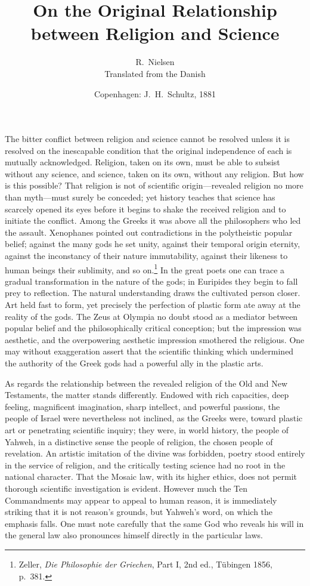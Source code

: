 \documentclass[12pt,a4paper]{article}
\title{\textbf{On the Original Relationship\\[4pt]
       between Religion and Science}}
\author{R.\ Nielsen\\[4pt]
  \small Translated from the Danish}
\date{Copenhagen: J.\ H.\ Schultz, 1881}
\begin{document}
\maketitle
\thispagestyle{fancy}

\bigskip

The bitter conflict between religion and science cannot be resolved
unless it is resolved on the inescapable condition that the original
independence of each is mutually acknowledged. Religion, taken on its
own, must be able to subsist without any science, and science, taken on
its own, without any religion. But how is this possible? That religion
is not of scientific origin---revealed religion no more than myth---must
surely be conceded; yet history teaches that science has scarcely
opened its eyes before it begins to shake the received religion and to
initiate the conflict. Among the Greeks it was above all the
philosophers who led the assault. Xenophanes pointed out contradictions
in the polytheistic popular belief; against the many gods he set unity,
against their temporal origin eternity, against the inconstancy of
their nature immutability, against their likeness to human beings their
sublimity, and so on.\footnote{Zeller, \emph{Die Philosophie der
Griechen}, Part I, 2nd ed., T\"ubingen 1856, p.\ 381.} In the great
poets one can trace a gradual transformation in the nature of the gods;
in Euripides they begin to fall prey to reflection. The natural
understanding draws the cultivated person closer. Art held fast to
form, yet precisely the perfection of plastic form ate away at the
reality of the gods. The Zeus at Olympia no doubt stood as a mediator
between popular belief and the philosophically critical conception; but
the impression was aesthetic, and the overpowering aesthetic impression
smothered the religious. One may without exaggeration assert that the
scientific thinking which undermined the authority of the Greek gods had
a powerful ally in the plastic arts.

As regards the relationship between the revealed religion of the Old
and New Testaments, the matter stands differently. Endowed with rich
capacities, deep feeling, magnificent imagination, sharp intellect, and
powerful passions, the people of Israel were nevertheless not inclined,
as the Greeks were, toward plastic art or penetrating scientific
inquiry; they were, in world history, the people of Yahweh, in a
distinctive sense the people of religion, the chosen people of
revelation. An artistic imitation of the divine was forbidden, poetry
stood entirely in the service of religion, and the critically testing
science had no root in the national character. That the Mosaic law,
with its higher ethics, does not permit thorough scientific
investigation is evident. However much the Ten Commandments may appear
to appeal to human reason, it is immediately striking that it is not
reason's grounds, but Yahweh's word, on which the emphasis falls. One
must note carefully that the same God who reveals his will in the
general law also pronounces himself directly in the particular laws.
\end{document}
